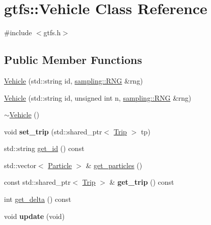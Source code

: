 \hypertarget{classgtfs_1_1Vehicle}{}\section{gtfs\+:\+:Vehicle Class Reference}
\label{classgtfs_1_1Vehicle}


{\ttfamily \#include $<$gtfs.\+h$>$}

\subsection*{Public Member Functions}
\begin{DoxyCompactItemize}
\item 
\hyperlink{classgtfs_1_1Vehicle_a8838934149e47eeb7160f1755012dcd4}{Vehicle} (std\+::string id, \hyperlink{classsampling_1_1RNG}{sampling\+::\+R\+NG} \&rng)
\item 
\hyperlink{classgtfs_1_1Vehicle_a12765a61077b4be7e65ab67b63eb9fcc}{Vehicle} (std\+::string id, unsigned int n, \hyperlink{classsampling_1_1RNG}{sampling\+::\+R\+NG} \&rng)
\item 
\hyperlink{classgtfs_1_1Vehicle_a08c7450dd0df9406f78b30be044d27d8}{$\sim$\+Vehicle} ()
\item 
\mbox{\label{classgtfs_1_1Vehicle_a47ceaf4bb31c01dd4b26a12f1b7b7089}} 
void {\bfseries set\+\_\+trip} (std\+::shared\+\_\+ptr$<$ \hyperlink{classgtfs_1_1Trip}{Trip} $>$ tp)
\item 
std\+::string \hyperlink{classgtfs_1_1Vehicle_a6b388986c9ed4af1eb86f13a3d2de8e0}{get\+\_\+id} () const
\item 
std\+::vector$<$ \hyperlink{classgtfs_1_1Particle}{Particle} $>$ \& \hyperlink{classgtfs_1_1Vehicle_a7b12b079c68880f00f532ca25858c368}{get\+\_\+particles} ()
\item 
\mbox{\label{classgtfs_1_1Vehicle_a616c83927f0d2d513d33277a9ebd3537}} 
const std\+::shared\+\_\+ptr$<$ \hyperlink{classgtfs_1_1Trip}{Trip} $>$ \& {\bfseries get\+\_\+trip} () const
\item 
int \hyperlink{classgtfs_1_1Vehicle_a23c0a191559e4066423d5f3cbfb70b46}{get\+\_\+delta} () const
\item 
\mbox{\label{classgtfs_1_1Vehicle_aab490aeda8084cfcb8de29f0aedaa416}} 
void {\bfseries update} (void)
\item 

\end{DoxyCompactItemize}
